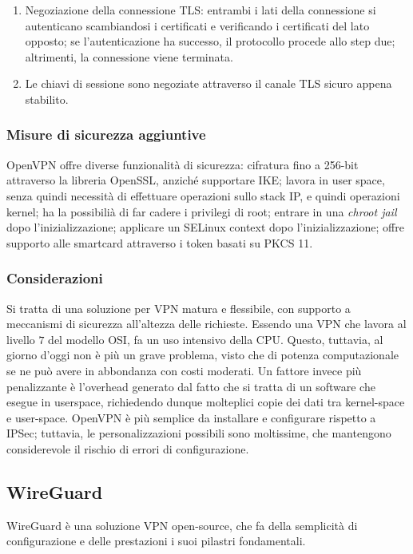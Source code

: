 \begin{enumerate}
    \item Negoziazione della connessione TLS: entrambi i lati della connessione si autenticano scambiandosi i certificati e verificando i certificati del lato opposto; se l'autenticazione ha successo, il protocollo procede allo step due; altrimenti, la connessione viene terminata.
    \item Le chiavi di sessione sono negoziate attraverso il canale TLS sicuro appena stabilito.
\end{enumerate}


\subsubsection{Misure di sicurezza aggiuntive}
OpenVPN offre diverse funzionalità di sicurezza: cifratura fino a 256-bit attraverso la libreria OpenSSL, anziché supportare IKE; lavora in user space, senza quindi necessità di effettuare operazioni sullo stack IP, e quindi operazioni kernel; ha la possibilià di far cadere i privilegi di root; entrare in una \emph{chroot jail} dopo l'inizializzazione; applicare un SELinux context dopo l'inizializzazione; offre supporto alle smartcard attraverso i token basati su PKCS 11.

\subsubsection{Considerazioni}
Si tratta di una soluzione per VPN matura e flessibile, con supporto a meccanismi di sicurezza all'altezza delle richieste.
Essendo una VPN che lavora al livello $7$ del modello OSI, fa un uso intensivo della CPU. Questo, tuttavia, al giorno d'oggi non è più un grave problema, visto che di potenza computazionale se ne può avere in abbondanza con costi moderati.
Un fattore invece più penalizzante è l'overhead generato dal fatto che si tratta di un software che esegue in userspace, richiedendo dunque molteplici copie dei dati tra kernel-space e user-space.
OpenVPN è più semplice da installare e configurare rispetto a IPSec; tuttavia, le personalizzazioni possibili sono moltissime, che mantengono considerevole il rischio di errori di configurazione.

\subsection{WireGuard}
WireGuard è una soluzione VPN open-source, che fa della semplicità di configurazione e delle prestazioni i suoi pilastri fondamentali.
